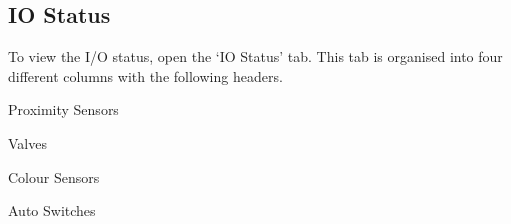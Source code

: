             \subsection{IO Status}
                To view the I/O status, open the `IO Status' tab. This tab is organised into four different columns with the following headers. 
                \begin{description}
                    \item Proximity Sensors
                    \item Valves
                    \item Colour Sensors
                    \item Auto Switches
                \end{description}

        



